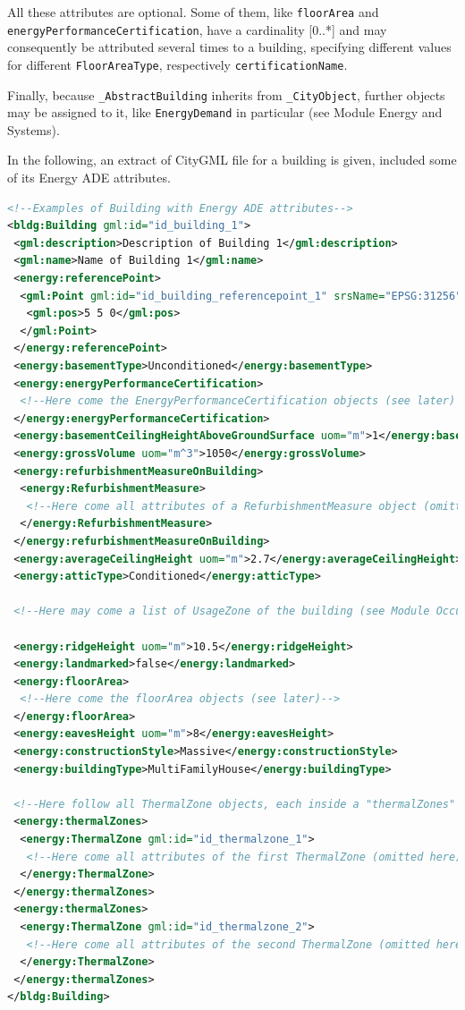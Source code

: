 \documentclass[a4paper,12pt]{article}
\begin{document}
All these attributes are optional. Some of them, like
\lstinline!floorArea! and\\
\lstinline!energyPerformanceCertification!, have a cardinality
{[}0..*{]} and may consequently be attributed several times to a
building, specifying different values for different
\lstinline!FloorAreaType!, respectively \lstinline!certificationName!.

Finally, because \lstinline!_AbstractBuilding! inherits from
\lstinline!_CityObject!, further objects may be assigned to it, like
\lstinline!EnergyDemand! in particular (see Module Energy and Systems).

In the following, an extract of CityGML file for a building is given,
included some of its Energy ADE attributes.

\begin{lstlisting}[language=XML]
<!--Examples of Building with Energy ADE attributes-->
<bldg:Building gml:id="id_building_1">
 <gml:description>Description of Building 1</gml:description>
 <gml:name>Name of Building 1</gml:name>
 <energy:referencePoint>
  <gml:Point gml:id="id_building_referencepoint_1" srsName="EPSG:31256" srsDimension="3">
   <gml:pos>5 5 0</gml:pos>
  </gml:Point>
 </energy:referencePoint>
 <energy:basementType>Unconditioned</energy:basementType>
 <energy:energyPerformanceCertification>
  <!--Here come the EnergyPerformanceCertification objects (see later) -->
 </energy:energyPerformanceCertification>
 <energy:basementCeilingHeightAboveGroundSurface uom="m">1</energy:basementCeilingHeightAboveGroundSurface>
 <energy:grossVolume uom="m^3">1050</energy:grossVolume>
 <energy:refurbishmentMeasureOnBuilding>
  <energy:RefurbishmentMeasure>
   <!--Here come all attributes of a RefurbishmentMeasure object (omitted here)-->
  </energy:RefurbishmentMeasure>
 </energy:refurbishmentMeasureOnBuilding>
 <energy:averageCeilingHeight uom="m">2.7</energy:averageCeilingHeight>
 <energy:atticType>Conditioned</energy:atticType>
 
 <!--Here may come a list of UsageZone of the building (see Module Occupancy) -->
 
 <energy:ridgeHeight uom="m">10.5</energy:ridgeHeight>
 <energy:landmarked>false</energy:landmarked>
 <energy:floorArea>
  <!--Here come the floorArea objects (see later)-->
 </energy:floorArea>
 <energy:eavesHeight uom="m">8</energy:eavesHeight>
 <energy:constructionStyle>Massive</energy:constructionStyle>
 <energy:buildingType>MultiFamilyHouse</energy:buildingType>
 
 <!--Here follow all ThermalZone objects, each inside a "thermalZones" tag-->
 <energy:thermalZones>
  <energy:ThermalZone gml:id="id_thermalzone_1">
   <!--Here come all attributes of the first ThermalZone (omitted here)-->
  </energy:ThermalZone>
 </energy:thermalZones>
 <energy:thermalZones>
  <energy:ThermalZone gml:id="id_thermalzone_2">
   <!--Here come all attributes of the second ThermalZone (omitted here)-->
  </energy:ThermalZone>
 </energy:thermalZones>
</bldg:Building>
\end{lstlisting}
\end{document}
